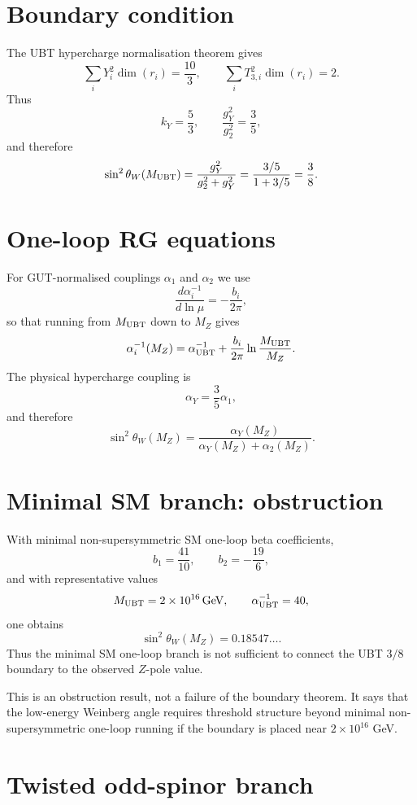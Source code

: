 \documentclass[12pt,a4paper]{article}
\begin{document}
\section{Boundary condition}

The UBT hypercharge normalisation theorem gives
\[
  \sum_i Y_i^2\dim(r_i)=\frac{10}{3},
  \qquad
  \sum_i T_{3,i}^2\dim(r_i)=2.
\]
Thus
\[
  k_Y=\frac{5}{3},
  \qquad
  \frac{g_Y^2}{g_2^2}=\frac{3}{5},
\]
and therefore
\[
  \sin^2\theta_W(M_{\rm UBT})
  =
  \frac{g_Y^2}{g_2^2+g_Y^2}
  =
  \frac{3/5}{1+3/5}
  =
  \frac38.
\]

\section{One-loop RG equations}

For GUT-normalised couplings $\alpha_1$ and $\alpha_2$ we use
\[
  \frac{d\alpha_i^{-1}}{d\ln\mu}
  =-\frac{b_i}{2\pi},
\]
so that running from $M_{\rm UBT}$ down to $M_Z$ gives
\[
  \alpha_i^{-1}(M_Z)
  =
  \alpha_{\rm UBT}^{-1}
  +
  \frac{b_i}{2\pi}
  \ln\frac{M_{\rm UBT}}{M_Z}.
\]
The physical hypercharge coupling is
\[
  \alpha_Y=\frac35\alpha_1,
\]
and therefore
\[
  \sin^2\theta_W(M_Z)
  =
  \frac{\alpha_Y(M_Z)}{\alpha_Y(M_Z)+\alpha_2(M_Z)}.
\]

\section{Minimal SM branch: obstruction}

With minimal non-supersymmetric SM one-loop beta coefficients,
\[
  b_1=\frac{41}{10},
  \qquad
  b_2=-\frac{19}{6},
\]
and with representative values
\[
  M_{\rm UBT}=2\times10^{16}\,{\rm GeV},
  \qquad
  \alpha_{\rm UBT}^{-1}=40,
\]
one obtains
\[
  \sin^2\theta_W(M_Z)=0.18547\ldots.
\]
Thus the minimal SM one-loop branch is not sufficient to connect the UBT
$3/8$ boundary to the observed $Z$-pole value.

\begin{statusbox}
This is an obstruction result, not a failure of the boundary theorem.  It says
that the low-energy Weinberg angle requires threshold structure beyond minimal
non-supersymmetric one-loop running if the boundary is placed near
$2\times10^{16}$ GeV.
\end{statusbox}

\section{Twisted odd-spinor branch}
\end{document}

